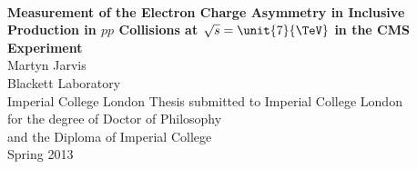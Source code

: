 \begin{titlepage}
\begin{center}
\vspace{5cm}
~
\\[2cm]
\Large{\textbf{Measurement of the Electron Charge Asymmetry in Inclusive \PW
Production in $pp$ Collisions at $\sqrt{s} = \unit{7}{\TeV}$ in the CMS
Experiment}}
\\[2cm]
\large{Martyn Jarvis}
\\[1cm]
\large{Blackett Laboratory\\Imperial College London}
\vfill
\normalsize{Thesis submitted to Imperial College London\\
       for the degree of Doctor of Philosophy\\
       and the Diploma of Imperial College}
\\[1cm]
\normalsize{Spring 2013}

\end{center}
\end{titlepage}
\cleardoublepage

